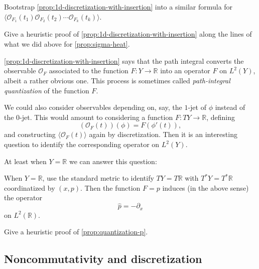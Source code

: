 \documentclass[12pt,letterpaper,reqno]{article}
\numberwithin{equation}{section}
\newcommand{\cO}{\ensuremath{\mathcal O}}
\newcommand{\R}{\ensuremath{\mathbb R}}
\newcommand{\IP}[1]{\langle#1\rangle}
\newcommand{\ti}[1]{\textit{#1}}
\newcommand{\fixme}[1]{{\color{orange}{[#1]}}}
\begin{document}
\begin{exercise}Bootstrap \autoref{prop:1d-discretization-with-insertion} into a similar formula
for $\IP{\cO_{F_1}(t_1) \cO_{F_2}(t_2) \cdots \cO_{F_k}(t_k)}$.
\end{exercise}

\begin{exercise}
Give a heuristic proof of \autoref{prop:1d-discretization-with-insertion} along the lines of 
what we did above for \autoref{prop:sigma-heat}.
\end{exercise}

\autoref{prop:1d-discretization-with-insertion} 
says that the path integral converts the
observable $\cO_F$ associated to the function $F: Y \to \R$ 
into an operator $\hat F$ on $L^2(Y)$, albeit
a rather obvious one. This process is sometimes called
\ti{path-integral quantization} of the function $F$.

We could also consider observables depending on, say, 
the $1$-jet of $\phi$ instead of the $0$-jet. This would 
amount to considering a function $F: TY \to \R$, defining
\begin{equation}
  (\cO_F(t)) (\phi) = F(\phi'(t)),
\end{equation}
and constructing $\IP{\cO_F(t)}$
again by discretization.
Then it is an interesting question to identify 
the corresponding operator on $L^2(Y)$.

At least when $Y = \R$ we can answer this question:
\fixme{though strictly speaking $Y = \R$ was not allowed
in our previous discussion}
\begin{prop} \label{prop:quantization-p}
When $Y = \R$, use the standard 
metric to identify $TY = T\R$ with $T^* Y = T^* \R$
coordinatized by $(x,p)$. Then the function $F = p$
induces (in the above sense) the operator
\begin{equation}
   \hat p = -\partial_x
\end{equation} 
on $L^2(\R)$.
\end{prop}

\begin{exercise} Give a heuristic proof
of \autoref{prop:quantization-p}.
\end{exercise}


\subsection{Noncommutativity and discretization}
\end{document}
